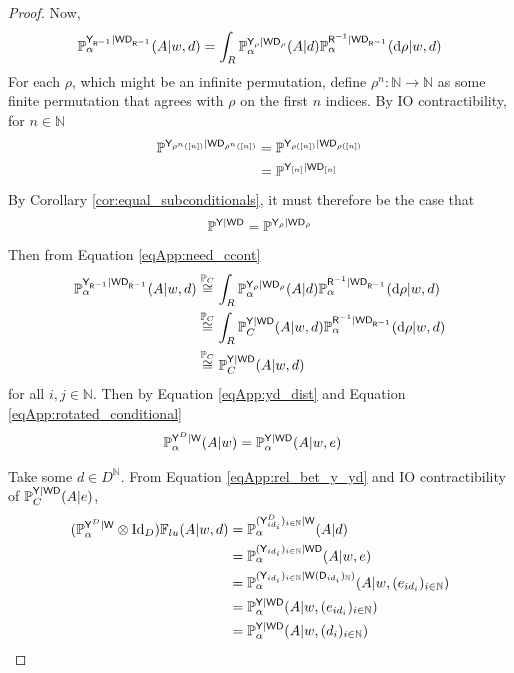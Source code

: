 \begin{proof}
Now,
\begin{align}
    \mathbb{P}^{\mathsf{Y}_{\mathsf{R}^{-1}}|\mathsf{W}\mathsf{D}_{\mathsf{R}^{-1}}}_\alpha(A|w,d) &= \int_R \mathbb{P}_\alpha^{\mathsf{Y}_\rho|\mathsf{W}\mathsf{D}_{\rho}}(A|d)\mathbb{P}_\alpha^{\mathsf{R}^{-1}|\mathsf{W}\mathsf{D}_{\mathsf{R}^{-1}}}(\mathrm{d}\rho|w,d)\label{eqApp:need_ccont}\\
\end{align}
For each $\rho$, which might be an infinite permutation, define $\rho^n:\mathbb{N}\to \mathbb{N}$ as some finite permutation that agrees with $\rho$ on the first $n$ indices. By IO contractibility, for $n\in \mathbb{N}$
\begin{align}
    \mathbb{P}^{\mathsf{Y}_{\rho^n([n])}|\mathsf{W}\mathsf{D}_{\rho^n([n])}} &= \mathbb{P}^{\mathsf{Y}_{\rho([n])}|\mathsf{W}\mathsf{D}_{\rho([n])}}\\
    &= \mathbb{P}^{\mathsf{Y}_{[n]}|\mathsf{W}\mathsf{D}_{[n]}}
\end{align}
By Corollary \ref{cor:equal_subconditionals}, it must therefore be the case that
\begin{align}
    \mathbb{P}^{\mathsf{Y}|\mathsf{W}\mathsf{D}} = \mathbb{P}^{\mathsf{Y}_{\rho}|\mathsf{W}\mathsf{D}_{\rho}}
\end{align}
Then from Equation \eqref{eqApp:need_ccont}
\begin{align}
    \mathbb{P}^{\mathsf{Y}_{\mathsf{R}^{-1}}|\mathsf{W}\mathsf{D}_{\mathsf{R}^{-1}}}_\alpha(A|w,d) &\overset{\mathbb{P}_C}{\cong} \int_R \mathbb{P}_\alpha^{\mathsf{Y}_\rho|\mathsf{W}\mathsf{D}_{\rho}}(A|d)\mathbb{P}_\alpha^{\mathsf{R}^{-1}|\mathsf{W}\mathsf{D}_{\mathsf{R}^{-1}}}(\mathrm{d}\rho|w,d)\\
    &\overset{\mathbb{P}_C}{\cong} \int_R \mathbb{P}_C^{\mathsf{Y}|\mathsf{WD}}(A|w,d)\mathbb{P}_\alpha^{\mathsf{R}^{-1}|\mathsf{W}\mathsf{D}_{\mathsf{R}^{-1}}}(\mathrm{d}\rho|w,d)\\
    &\overset{\mathbb{P}_C}{\cong} \mathbb{P}_C^{\mathsf{Y}|\mathsf{WD}}(A|w,d)\label{eqApp:rotated_conditional}
\end{align}
 for all $i,j\in \mathbb{N}$. Then by Equation \eqref{eqApp:yd_dist} and Equation \eqref{eqApp:rotated_conditional}
\begin{align}
    \mathbb{P}_\alpha^{\mathsf{Y}^D|\mathsf{W}}(A|w) &= \mathbb{P}_\alpha^{\mathsf{Y}|\mathsf{WD}}(A|w,e)\label{eqApp:rel_bet_y_yd}
\end{align}

Take some $d\in D^{\mathbb{N}}$. From Equation \eqref{eqApp:rel_bet_y_yd} and IO contractibility of $\mathbb{P}_C^{\mathsf{Y}|\mathsf{WD}}(A|e)$,
\begin{align}
    (\mathbb{P}_\alpha^{\mathsf{Y}^D|\mathsf{W}}\otimes \mathrm{Id}_D)\mathbb{F}_{lu}(A|w,d) &= \mathbb{P}_\alpha^{(\mathsf{Y}^D_{i d_i})_{i\in \mathbb{N}}|\mathsf{W}}(A|d)\\
    &=\mathbb{P}_\alpha^{(\mathsf{Y}_{i d_i})_{i\in \mathbb{N}}|\mathsf{WD}}(A|w,e)\\
    &= \mathbb{P}_\alpha^{(\mathsf{Y}_{i d_i})_{i\in \mathbb{N}}|\mathsf{W}(\mathsf{D}_{i d_i})_{\mathbb{N}})}(A|w,(e_{i d_i})_{i\in \mathbb{N}})\\
    &= \mathbb{P}_\alpha^{\mathsf{Y}|\mathsf{WD}}(A|w,(e_{i d_i})_{i\in \mathbb{N}})\\
    &= \mathbb{P}_\alpha^{\mathsf{Y}|\mathsf{WD}}(A|w,(d_i)_{i\in\mathbb{N}})
\end{align}


\end{proof}
